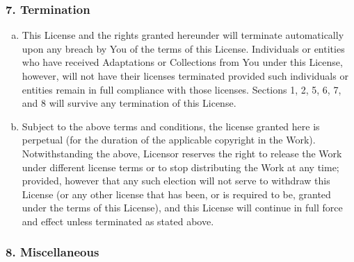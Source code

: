         \subsubsection{7. Termination}

\begin{enumerate}[a.]
          \item This License and the rights granted hereunder will
          terminate automatically upon any breach by You of the
          terms of this License. Individuals or entities who have
          received Adaptations or Collections from You under this
          License, however, will not have their licenses terminated
          provided such individuals or entities remain in full
          compliance with those licenses. Sections 1, 2, 5, 6, 7,
          and 8 will survive any termination of this License.

          \item Subject to the above terms and conditions, the
          license granted here is perpetual (for the duration of
          the applicable copyright in the Work). Notwithstanding
          the above, Licensor reserves the right to release the
          Work under different license terms or to stop
          distributing the Work at any time; provided, however that
          any such election will not serve to withdraw this License
          (or any other license that has been, or is required to
          be, granted under the terms of this License), and this
          License will continue in full force and effect unless
          terminated as stated above.
\end{enumerate}

        \subsubsection{8. Miscellaneous}

